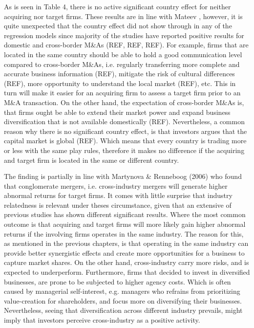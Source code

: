 \documentclass[preprint,10pt]{elsarticle}
\begin{document}
 As is seen in Table 4, there is no active significant country effect for neither acquiring nor target firms. These results are in line with Mateev \cite{MATEEV2017}, however, it is quite unexpected that the country effect did not show through in any of the regression models since majority of the studies have reported positive results for domestic and cross-border M\&As (REF, REF, REF). For example, firms that are located in the same country should be able to hold a good communication level compared to cross-border M\&As, i.e. regularly transferring more complete and accurate business information (REF), mitigate the risk of cultural differences (REF), more opportunity to understand the local market (REF), etc. This in turn will make it easier for an acquiring firm to assess a target firm prior to an M\&A transaction. On the other hand, the expectation of cross-border M\&As is, that firms ought be able to extend their market power and expand business diversification that is not available domestically (REF). Nevertheless, a common reason why there is no significant country effect, is that investors argues that the capital market is global (REF). Which means that every country is trading more or less with the same play rules, therefore it makes no difference if the acquiring and target firm is located in the same or different country.


The finding is partially in line with Martynova \& Renneboog (2006) who found that conglomerate mergers, i.e. cross-industry mergers will generate higher abnormal returns for target firms. It comes with little surprise that industry relatedness is relevant under theses circumstance, given that an extensive of previous studies has shown different significant results. Where the most common outcome is that acquiring and target firms will more likely gain higher abnormal returns if the involving firms operates in the same industry. The reason for this, as mentioned in the previous chapters, is that operating in the same industry can provide better synergistic effects and create more opportunities for a business to capture market shares. On the other hand, cross-industry carry more risks, and is expected to underperform. Furthermore, firms that decided to invest in diversified businesses, are prone to be subjected to higher agency costs. Which is often caused by managerial self-interest, e.g. managers who refrains from prioritizing value-creation for shareholders, and focus more on diversifying their businesses. Nevertheless, seeing that diversification across different industry prevails, might imply that investors perceive cross-industry as a positive activity.
\end{document}
